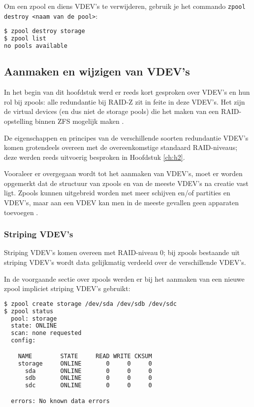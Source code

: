 Om een zpool en diens VDEV's te verwijderen, gebruik je het commando \texttt{zpool destroy <naam van de pool>}:

\begin{lstlisting}[language=bash,style=command_style]
$ zpool destroy storage
$ zpool list
no pools available
\end{lstlisting}

\clearpage

\subsection{Aanmaken en wijzigen van VDEV's}

In het begin van dit hoofdstuk werd er reeds kort gesproken over VDEV's en hun rol bij zpools: alle redundantie bij RAID-Z zit in feite in deze VDEV's. Het zijn de virtual devices (en dus niet de storage pools) die het maken van een RAID-opstelling binnen ZFS mogelijk maken \autocite{Lucas2015}.

De eigenschappen en principes van de verschillende soorten redundantie VDEV's komen grotendeels overeen met de overeenkomstige standaard RAID-niveaus; deze werden reeds uitvoerig besproken in Hoofdstuk \ref{ch:h2}.

Vooraleer er overgegaan wordt tot het aanmaken van VDEV's, moet er worden opgemerkt dat de structuur van zpools en van de meeste VDEV's na creatie vast ligt. Zpools kunnen uitgebreid worden met meer schijven en/of partities en VDEV's, maar aan een VDEV kan men in de meeste gevallen geen apparaten toevoegen \autocite{FBSDDP2017}. 

\subsubsection{Striping VDEV's}

Striping VDEV's komen overeen met RAID-niveau 0; bij zpools bestaande uit \gls{striping} VDEV's wordt data gelijkmatig verdeeld over de verschillende VDEV's.

In de voorgaande sectie over zpools werden er bij het aanmaken van een nieuwe zpool impliciet \gls{striping} VDEV's gebruikt:

\begin{lstlisting}[language=bash,style=command_style]
$ zpool create storage /dev/sda /dev/sdb /dev/sdc
$ zpool status
  pool: storage
  state: ONLINE
  scan: none requested
  config:

	NAME        STATE     READ WRITE CKSUM
	storage     ONLINE       0     0     0
	  sda       ONLINE       0     0     0
	  sdb       ONLINE       0     0     0
	  sdc       ONLINE       0     0     0

  errors: No known data errors
\end{lstlisting}

